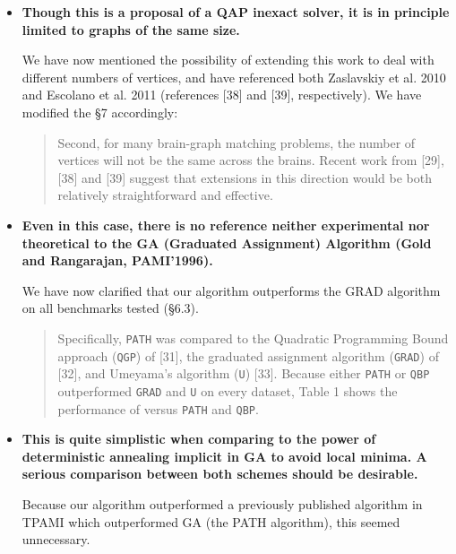 \documentclass[11pt]{article}
\begin{document}
\begin{itemize}
	\item \textbf{Though this is a proposal of a QAP inexact solver, it is in principle limited to graphs of the same size.}

We have now mentioned the possibility of extending this work to deal with different numbers of vertices, and have referenced both Zaslavskiy et al. 2010 and Escolano et al. 2011 (references [38] and [39], respectively).	We have modified the \S 7 accordingly:

	 	\begin{quote}
			Second, for many brain-graph matching problems, the number of vertices will not be the same across the brains.  Recent work from [29],[38]  and [39] suggest that extensions in this direction would be both relatively straightforward and effective. 
		\end{quote}

	\item \textbf{Even in this case, there is no reference neither experimental nor theoretical to the GA (Graduated Assignment) Algorithm (Gold and Rangarajan, PAMI'1996). }

We have now clarified that our algorithm outperforms the GRAD algorithm on all benchmarks tested (\S 6.3).  

	\begin{quote}
Specifically, \texttt{PATH} was compared to the Quadratic Programming Bound approach (\texttt{QGP}) of [31], the graduated assignment algorithm (\texttt{GRAD}) of [32], and Umeyama's algorithm (\texttt{U}) [33].  Because either \texttt{PATH} or \texttt{QBP} outperformed \texttt{GRAD} and \texttt{U} on every dataset, Table 1 shows the performance of \faqap versus \texttt{PATH} and \texttt{QBP}. 
	\end{quote}



	\item \textbf{This is quite simplistic when comparing to the power of deterministic annealing implicit in GA to avoid local minima. A serious comparison between both schemes should be desirable.}

Because our algorithm outperformed a previously published algorithm in TPAMI which outperformed GA (the PATH algorithm), this seemed unnecessary.


\end{itemize}
\end{document}
